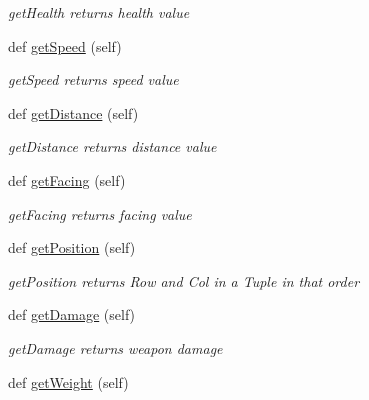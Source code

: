 \begin{DoxyCompactItemize}
\begin{DoxyCompactList}\small\item\em get\+Health returns health value \end{DoxyCompactList}\item 
\hypertarget{classGladiator_1_1Gladiator_ab61a5131b61ba8467c578efac0123d3c}{}def \hyperlink{classGladiator_1_1Gladiator_ab61a5131b61ba8467c578efac0123d3c}{get\+Speed} (self)\label{classGladiator_1_1Gladiator_ab61a5131b61ba8467c578efac0123d3c}

\begin{DoxyCompactList}\small\item\em get\+Speed returns speed value \end{DoxyCompactList}\item 
\hypertarget{classGladiator_1_1Gladiator_a1c15cf9dc2bdb8fd3701d2c615ac00af}{}def \hyperlink{classGladiator_1_1Gladiator_a1c15cf9dc2bdb8fd3701d2c615ac00af}{get\+Distance} (self)\label{classGladiator_1_1Gladiator_a1c15cf9dc2bdb8fd3701d2c615ac00af}

\begin{DoxyCompactList}\small\item\em get\+Distance returns distance value \end{DoxyCompactList}\item 
\hypertarget{classGladiator_1_1Gladiator_ae530b1cf364f7816b4008fb4c387f494}{}def \hyperlink{classGladiator_1_1Gladiator_ae530b1cf364f7816b4008fb4c387f494}{get\+Facing} (self)\label{classGladiator_1_1Gladiator_ae530b1cf364f7816b4008fb4c387f494}

\begin{DoxyCompactList}\small\item\em get\+Facing returns facing value \end{DoxyCompactList}\item 
\hypertarget{classGladiator_1_1Gladiator_a6bfdfbf15f60592c26c269b23f6de048}{}def \hyperlink{classGladiator_1_1Gladiator_a6bfdfbf15f60592c26c269b23f6de048}{get\+Position} (self)\label{classGladiator_1_1Gladiator_a6bfdfbf15f60592c26c269b23f6de048}

\begin{DoxyCompactList}\small\item\em get\+Position returns Row and Col in a Tuple in that order \end{DoxyCompactList}\item 
def \hyperlink{classGladiator_1_1Gladiator_a91e1a1fd45067a0366433ee67e1fc022}{get\+Damage} (self)
\begin{DoxyCompactList}\small\item\em get\+Damage returns weapon damage \end{DoxyCompactList}\item 
\hypertarget{classGladiator_1_1Gladiator_a682b3f1fe2adc4cb85604906a8caed48}{}def \hyperlink{classGladiator_1_1Gladiator_a682b3f1fe2adc4cb85604906a8caed48}{get\+Weight} (self)\label{classGladiator_1_1Gladiator_a682b3f1fe2adc4cb85604906a8caed48}


\end{DoxyCompactItemize}
